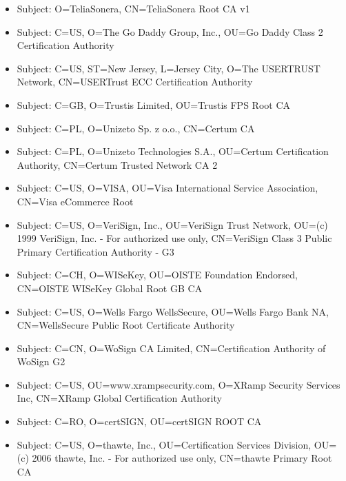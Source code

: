 \documentclass[xcolor={dvipsnames,svgnames},hyperref=dvips]{beamer}
\begin{document}
	\begin{frame}
		\begin{itemize}
		\item Subject: O=TeliaSonera, CN=TeliaSonera Root CA v1
		\item Subject: C=US, O=The Go Daddy Group, Inc., OU=Go Daddy Class 2 Certification Authority
		\item Subject: C=US, ST=New Jersey, L=Jersey City, O=The USERTRUST Network, CN=USERTrust ECC Certification Authority
		\item Subject: C=GB, O=Trustis Limited, OU=Trustis FPS Root CA
		\item Subject: C=PL, O=Unizeto Sp. z o.o., CN=Certum CA
		\end{itemize}
	\end{frame}
	\begin{frame}
		\begin{itemize}
		\item Subject: C=PL, O=Unizeto Technologies S.A., OU=Certum Certification Authority, CN=Certum Trusted Network CA 2
		\item Subject: C=US, O=VISA, OU=Visa International Service Association, CN=Visa eCommerce Root
		\item Subject: C=US, O=VeriSign, Inc., OU=VeriSign Trust Network, OU=(c) 1999 VeriSign, Inc. - For authorized use only, CN=VeriSign Class 3 Public Primary Certification Authority - G3
		\item Subject: C=CH, O=WISeKey, OU=OISTE Foundation Endorsed, CN=OISTE WISeKey Global Root GB CA
		\item Subject: C=US, O=Wells Fargo WellsSecure, OU=Wells Fargo Bank NA, CN=WellsSecure Public Root Certificate Authority
		\end{itemize}
	\end{frame}
	\begin{frame}
		\begin{itemize}
		\item Subject: C=CN, O=WoSign CA Limited, CN=Certification Authority of WoSign G2
		\item Subject: C=US, OU=www.xrampsecurity.com, O=XRamp Security Services Inc, CN=XRamp Global Certification Authority
		\item Subject: C=RO, O=certSIGN, OU=certSIGN ROOT CA
		\item Subject: C=US, O=thawte, Inc., OU=Certification Services Division, OU=(c) 2006 thawte, Inc. - For authorized use only, CN=thawte Primary Root CA
		\end{itemize}
	\end{frame}
\end{document}
